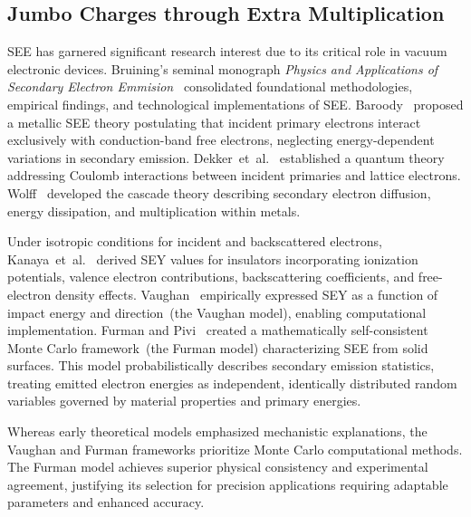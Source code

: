 \subsection{Jumbo Charges through Extra Multiplication}\label{sec:see}
SEE has garnered significant research interest due to its critical role in vacuum electronic devices. Bruining's seminal monograph \textit{Physics and Applications of Secondary Electron Emmision}~\cite{bruining_physics_1954} consolidated foundational methodologies, empirical findings, and technological implementations of SEE. Baroody~\cite{baroody1950theory} proposed a metallic SEE theory postulating that incident primary electrons interact exclusively with conduction-band free electrons, neglecting energy-dependent variations in secondary emission. Dekker~et~al.~\cite{dekker1952theory} established a quantum theory addressing Coulomb interactions between incident primaries and lattice electrons. Wolff~\cite{wolff1954theory} developed the cascade theory describing secondary electron diffusion, energy dissipation, and multiplication within metals.

Under isotropic conditions for incident and backscattered electrons, Kanaya~et~al.~\cite{Kanaya_1978} derived SEY values for insulators incorporating ionization potentials, valence electron contributions, backscattering coefficients, and free-electron density effects. Vaughan~\cite{vaughan} empirically expressed SEY as a function of impact energy and direction~(the Vaughan model), enabling computational implementation. Furman and Pivi~\cite{2002Probabilistic} created a mathematically self-consistent Monte Carlo framework~(the Furman model) characterizing SEE from solid surfaces. This model probabilistically describes secondary emission statistics, treating emitted electron energies as independent, identically distributed random variables governed by material properties and primary energies.

Whereas early theoretical models emphasized mechanistic explanations, the Vaughan and Furman frameworks prioritize Monte Carlo computational methods. The Furman model achieves superior physical consistency and experimental agreement, justifying its selection for precision applications requiring adaptable parameters and enhanced accuracy.


